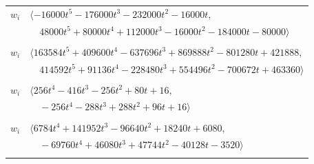 \documentclass[11pt]{article}
\begin{document}
\begin{longtable}{@{}ll@{}}
$w_i$ & $\langle -16000t^{5}-176000t^{3}-232000t^{2}-16000t,$\\
 & $\quad 48000t^{5}+80000t^{4}+112000t^{3}-16000t^{2}-184000t-80000\rangle$\\
\addlinespace[2pt]
\multicolumn{2}{@{}p{0.97\textwidth}@{}}{$i=51$, $D_i=2$, $e_i=0$, $\rho_{ij}$: $8{:}3, \allowbreak 13{:}3, \allowbreak 14{:}1, \allowbreak 15{:}1, \allowbreak 19{:}2, \allowbreak 20{:}2, \allowbreak 21{:}1, \allowbreak 24{:}3, \allowbreak 25{:}3, \allowbreak 27{:}3, \allowbreak 32{:}2, \allowbreak 36{:}3, \allowbreak 55{:}1, \allowbreak 57{:}2, \allowbreak 62{:}2, \allowbreak 63{:}2, \allowbreak 64{:}2, \allowbreak 76{:}1$}\\
$w_i$ & $\langle 163584t^{5}+409600t^{4}-637696t^{3}+869888t^{2}-801280t+421888,$\\
 & $\quad 414592t^{5}+91136t^{4}-228480t^{3}+554496t^{2}-700672t+463360\rangle$\\
\addlinespace[2pt]
\multicolumn{2}{@{}p{0.97\textwidth}@{}}{$i=52$, $D_i=1$, $\rho_{ij}$: $3{:}3, \allowbreak 4{:}1, \allowbreak 7{:}1, \allowbreak 14{:}1, \allowbreak 16{:}1, \allowbreak 18{:}3, \allowbreak 21{:}2, \allowbreak 22{:}3, \allowbreak 26{:}2, \allowbreak 40{:}1, \allowbreak 48{:}1, \allowbreak 55{:}1, \allowbreak 71{:}3$}\\
$w_i$ & $\langle 256t^{4}-416t^{3}-256t^{2}+80t+16,$\\
 & $\quad -256t^{4}-288t^{3}+288t^{2}+96t+16\rangle$\\
\addlinespace[2pt]
\multicolumn{2}{@{}p{0.97\textwidth}@{}}{$i=53$, $D_i=2$, $e_i=2$, $\rho_{ij}$: $5{:}1, \allowbreak 9{:}1, \allowbreak 11{:}3, \allowbreak 15{:}3, \allowbreak 20{:}1, \allowbreak 30{:}3, \allowbreak 31{:}3, \allowbreak 39{:}2, \allowbreak 44{:}3, \allowbreak 50{:}1, \allowbreak 54{:}3, \allowbreak 57{:}3, \allowbreak 59{:}2, \allowbreak 72{:}1$}\\
$w_i$ & $\langle 6784t^{4}+141952t^{3}-96640t^{2}+18240t+6080,$\\
 & $\quad -69760t^{4}+46080t^{3}+47744t^{2}-40128t-3520\rangle$\\
\addlinespace[2pt]
\multicolumn{2}{@{}p{0.97\textwidth}@{}}{$i=54$, $D_i=1$, $e_i=1$, $\rho_{ij}$: $2{:}3, \allowbreak 4{:}2, \allowbreak 9{:}2, \allowbreak 12{:}3, \allowbreak 14{:}1, \allowbreak 16{:}1, \allowbreak 19{:}2, \allowbreak 24{:}1, \allowbreak 28{:}3, \allowbreak 31{:}1, \allowbreak 44{:}3, \allowbreak 48{:}2, \allowbreak 49{:}2, \allowbreak 53{:}1, \allowbreak 58{:}3, \allowbreak 66{:}1, \allowbreak 74{:}3$}\\

\end{longtable}
\end{document}
